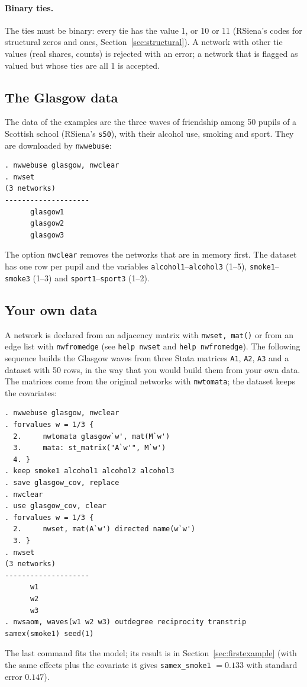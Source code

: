 \paragraph{Binary ties.} The ties must be binary: every tie has the value 1, or 10 or 11 (RSiena's codes for structural zeros and ones, Section~\ref{sec:structural}). A network with other tie values (real shares, counts) is rejected with an error; a network that is flagged as valued but whose ties are all 1 is accepted.

\subsection*{The Glasgow data}

The data of the examples are the three waves of friendship among 50 pupils of a Scottish school (RSiena's \texttt{s50}), with their alcohol use, smoking and sport. They are downloaded by \texttt{nwwebuse}:
\begin{lstlisting}
. nwwebuse glasgow, nwclear
. nwset
(3 networks)
--------------------
      glasgow1
      glasgow2
      glasgow3
\end{lstlisting}
The option \texttt{nwclear} removes the networks that are in memory first. The dataset has one row per pupil and the variables \texttt{alcohol1}--\texttt{alcohol3} (1--5), \texttt{smoke1}--\texttt{smoke3} (1--3) and \texttt{sport1}--\texttt{sport3} (1--2).

\subsection*{Your own data}

A network is declared from an adjacency matrix with \texttt{nwset, mat()} or from an edge list with \texttt{nwfromedge} (see \texttt{help nwset} and \texttt{help nwfromedge}). The following sequence builds the Glasgow waves from three Stata matrices \texttt{A1}, \texttt{A2}, \texttt{A3} and a dataset with 50 rows, in the way that you would build them from your own data. The matrices come from the original networks with \texttt{nwtomata}; the dataset keeps the covariates:
\begin{lstlisting}
. nwwebuse glasgow, nwclear
. forvalues w = 1/3 {
  2.     nwtomata glasgow`w', mat(M`w')
  3.     mata: st_matrix("A`w'", M`w')
  4. }
. keep smoke1 alcohol1 alcohol2 alcohol3
. save glasgow_cov, replace
. nwclear
. use glasgow_cov, clear
. forvalues w = 1/3 {
  2.     nwset, mat(A`w') directed name(w`w')
  3. }
. nwset
(3 networks)
--------------------
      w1
      w2
      w3
. nwsaom, waves(w1 w2 w3) outdegree reciprocity transtrip samex(smoke1) seed(1)
\end{lstlisting}
The last command fits the model; its result is in Section~\ref{sec:firstexample} (with the same effects plus the covariate it gives \texttt{samex\_smoke1} $=0.133$ with standard error $0.147$).

